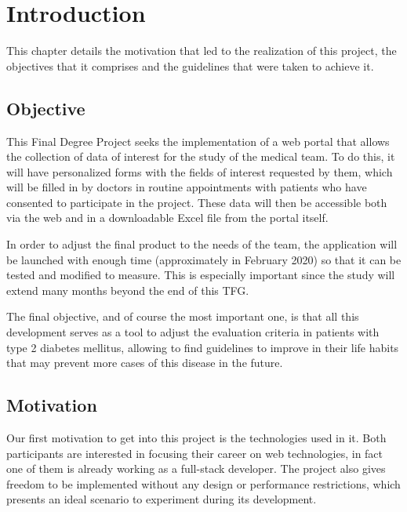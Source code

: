 \chapter{Introduction}
This chapter details the motivation that led to the realization of this project, the objectives that it comprises and the guidelines that were taken to achieve it.


    \section{Objective}
    
    This Final Degree Project seeks the implementation of a web portal that allows the collection of data of interest for the study of the medical team. To do this, it will have personalized forms with the fields of interest requested by them, which will be filled in by doctors in routine appointments with patients who have consented to participate in the project. These data will then be accessible both via the web and in a downloadable Excel file from the portal itself.\newline
	
    In order to adjust the final product to the needs of the team, the application will be launched with 
    enough time (approximately in February 2020) so that it can be tested and modified to measure. This is especially important since the study will extend many months beyond the end of this TFG.\newline
	
	The final objective, and of course the most important one, is that all this development serves as a tool to adjust the evaluation criteria in patients with type 2 diabetes mellitus, allowing to find guidelines to improve in their life habits that may prevent more cases of this disease in the future.\newpage
	
	\section{Motivation}
    
    Our first motivation to get into this project is the technologies used in it. Both participants are interested in focusing their career on web technologies, in fact one of them is already working as a full-stack developer. The project also gives freedom to be implemented without any design or performance restrictions, which presents an ideal scenario to experiment during its development.\newline
	
